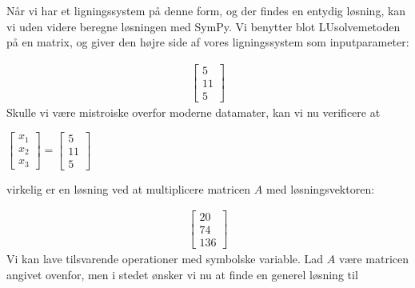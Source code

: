 \documentclass[letterpaper,10pt,english]{jupyterBook}
\begin{document}
Når vi har et ligningssystem på denne form, og der findes en entydig løsning, kan vi uden videre beregne løsningen med SymPy. Vi benytter blot LUsolve\sphinxhyphen{}metoden på en matrix, og giver den højre side af vores ligningssystem som inputparameter:

\begin{sphinxVerbatim}[commandchars=\\\{\}]
  \PYG{p}{[}\PYG{p}{[}  \PYG{p}{]} \PYG{p}{[}  \PYG{p}{]} \PYG{p}{[}  \PYG{p}{]}\PYG{p}{]}
  \PYG{p}{[}  \PYG{p}{]}

  
\end{sphinxVerbatim}
\begin{equation*}
\begin{split}\displaystyle \left[\begin{matrix}5\\11\\5\end{matrix}\right]\end{split}
\end{equation*}
Skulle vi være mistroiske overfor moderne datamater, kan vi nu verificere at

\(\displaystyle \left[\begin{matrix}x_{1}\\x_{2}\\x_{3}\end{matrix}\right] = \displaystyle \left[\begin{matrix}5 \\11\\5\end{matrix}\right]\)

virkelig er en løsning ved at multiplicere matricen \(A\) med løsningsvektoren:

\begin{sphinxVerbatim}[commandchars=\\\{\}]
  
\end{sphinxVerbatim}
\begin{equation*}
\begin{split}\displaystyle \left[\begin{matrix}20\\74\\136\end{matrix}\right]\end{split}
\end{equation*}
Vi kan lave tilsvarende operationer med symbolske variable. Lad \(A\) være matricen angivet ovenfor, men i stedet ønsker vi nu at finde en generel løsning til
\end{document}
